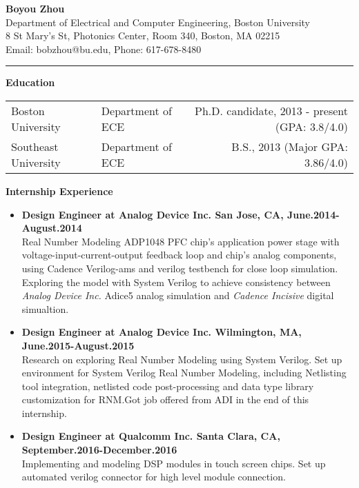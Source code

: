 \documentclass[]{article}
\begin{document}
\pagestyle{empty}
\begin{center}
{\large\textbf{Boyou Zhou}}\\
Department of Electrical and Computer Engineering, Boston University\\
8 St Mary's St, Photonics Center, Room 340, Boston, MA 02215\\
Email: bobzhou@bu.edu, Phone: 617-678-8480\\
\rule[-0.1cm]{7.5in}{0.01cm}
\end{center}
%

\textbf{Education}
\begin{table*}[h]
  \begin{tabular}{p{2.0in}p{2.0in}r}
    Boston University& Department of ECE & Ph.D. candidate, 2013 - present
    (GPA: 3.8/4.0)\\ 
    Southeast University & Department of ECE & B.S., 2013
    (Major GPA: 3.86/4.0)\\ 
  \end{tabular}
  \label{tbl:1}
\end{table*}

\noindent \textbf{Internship Experience}
    \begin{itemize}
        \item \textbf{Design Engineer at Analog Device Inc. San Jose, CA, June.2014-August.2014}\\
        Real Number Modeling ADP1048 PFC chip's application power stage with
        voltage-input-current-output feedback loop and chip's analog components, using Cadence
        Verilog-ams and verilog testbench for close loop simulation. Exploring the model with System
        Verilog to achieve consistency between \textit{Analog Device Inc.} Adice5 analog simulation
        and \textit{Cadence Incisive} digital simualtion. 
        \item \textbf{Design Engineer at Analog Device Inc. Wilmington, MA, June.2015-August.2015}\\
        Research on exploring Real Number Modeling using System Verilog. Set up environment for
        System Verilog Real Number Modeling, including Netlisting tool integration, netlisted code
        post-processing and data type library customization for RNM.\@ Got job
        offered from ADI in the end of this internship.
		\item \textbf{Design Engineer at Qualcomm Inc. Santa Clara, CA, September.2016-December.2016}\\
		Implementing and modeling DSP modules in touch screen chips. Set up
		automated verilog connector for high level module connection.
    \end{itemize}
\end{document}
